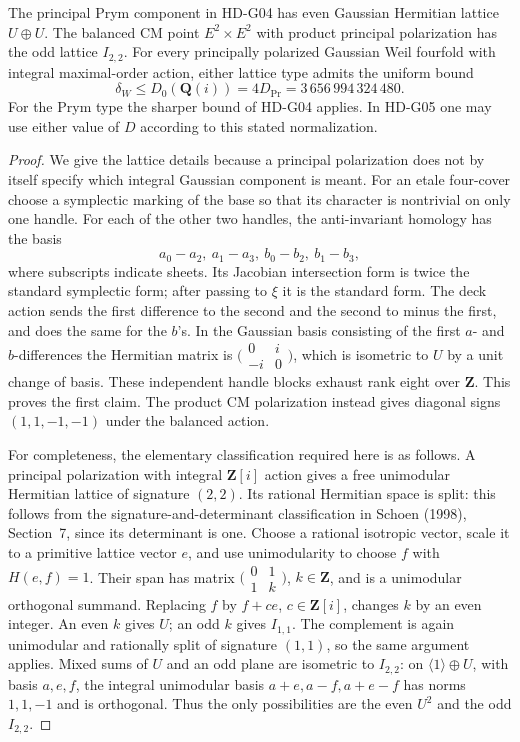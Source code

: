 \begin{proposition}
\label{HD-G06}
The principal Prym component in HD-G04 has even Gaussian Hermitian
lattice $U\oplus U$. The balanced CM point $E^2\times E^2$ with product
principal polarization has the odd lattice $I_{2,2}$. For every
principally polarized Gaussian Weil fourfold with integral maximal-order
action, either lattice type admits the uniform bound
\[
 \delta_W\le D_0(\mathbf Q(i))
       =4D_{\mathrm{Pr}}=3\,656\,994\,324\,480.
\]
For the Prym type the sharper bound of HD-G04 applies. In HD-G05 one
may use either value of $D$ according to this stated normalization.
\end{proposition}
\begin{proof}
We give the lattice details because a principal polarization does not
by itself specify which integral Gaussian component is meant.
For an etale four-cover choose a symplectic marking of the base so
that its character is nontrivial on only one handle. For each of the
other two handles, the anti-invariant homology has the basis
\[
 a_0-a_2,\ a_1-a_3,\ b_0-b_2,\ b_1-b_3,
\]
where subscripts indicate sheets. Its Jacobian intersection form is
twice the standard symplectic form; after passing to $\xi$ it is
the standard form. The deck action sends the first difference to the
second and the second to minus the first, and does the same for the
$b$'s. In the Gaussian basis consisting of the first $a$- and
$b$-differences the Hermitian matrix is
$\bigl(\begin{smallmatrix}0&i\\-i&0\end{smallmatrix}\bigr)$, which is
isometric to $U$ by a unit change of basis. These independent handle
blocks exhaust rank eight over $\mathbf Z$. This proves the first
claim. The product CM polarization instead gives diagonal signs
$(1,1,-1,-1)$ under the balanced action.

For completeness, the elementary classification required here is as
follows. A principal polarization with integral $\mathbf Z[i]$ action
gives a free unimodular Hermitian lattice of signature $(2,2)$.
Its rational Hermitian space is split: this follows from the
signature-and-determinant classification in Schoen (1998), Section~7,
since its determinant is one. Choose a rational isotropic vector,
scale it to a primitive lattice vector $e$, and use unimodularity to
choose $f$ with $H(e,f)=1$. Their span has matrix
$\bigl(\begin{smallmatrix}0&1\\1&k\end{smallmatrix}\bigr)$,
$k\in\mathbf Z$, and is a unimodular orthogonal summand. Replacing
$f$ by $f+ce$, $c\in\mathbf Z[i]$, changes $k$ by an even integer.
An even $k$ gives $U$; an odd $k$ gives $I_{1,1}$.
The complement is again unimodular and rationally split of signature
$(1,1)$, so the same argument applies. Mixed sums of $U$ and an odd
plane are isometric to $I_{2,2}$: on
$\langle1\rangle\oplus U$, with basis $a,e,f$, the integral
unimodular basis $a+e,a-f,a+e-f$ has norms $1,1,-1$ and is orthogonal.
Thus the only possibilities are the even $U^2$ and the odd $I_{2,2}$.


\end{proof}
